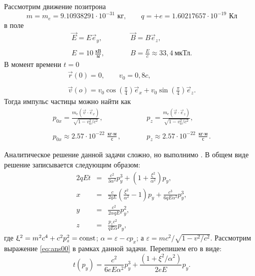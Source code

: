 Рассмотрим движение позитрона 
\begin{equation*}
m = m_e = 9.10938291 \cdot 10^{-31} \text{ кг}, \qquad q = +e = 1.60217657 \cdot 10^{-19} \text{ Кл}
\end{equation*}
в поле 
\begin{eqnarray*}
\vec{E} = E  \vec{e}_y, &\qquad& \vec{B} = B  \vec{e}_z, \\ \\
E = 10\ \frac{\text{кВ}}{\text{м}}, &\qquad& B = \frac{E}{c} \approx 33,4\ \text{мкТл}.
\end{eqnarray*}
В момент времени $t = 0$
\begin{eqnarray*}
\vec{r}(0) = 0, \qquad v_0 = 0,8c, \\ \\
 \vec{v}(o) = v_0 \cos \left( \frac{\pi}{4}\right) \vec{e}_x + v_0 \sin \left( \frac{\pi}{4}\right) \vec{e}_z.
\end{eqnarray*}
Тогда импульс частицы можно найти как
\begin{eqnarray*}
p_{0x} = \frac{m_e (\vec{v} \cdot \vec{e}_x) }{\sqrt{1 - v_0^2/c^2}}, &\qquad& p_{z} = \frac{m_e (\vec{v} \cdot \vec{e}_z) }{\sqrt{1 - v_0^2/c^2}}, \\ \\
p_{0x} \approx 2.57\cdot 10^{-22}\ \frac{\text{кг} \cdot \text{м}}{\text{с}}, &\qquad& p_{z} \approx 2.57\cdot 10^{-22}\ \frac{\text{кг} \cdot \text{м}}{\text{с}}.
\end{eqnarray*}

Аналитическое решение данной задачи сложно, но выполнимо \cite{Landau2}. В общем виде решение записывается следующим образом:
\begin{eqnarray}
2qEt &=& \frac{c^2}{3 \alpha^2} p_y^3  + \left(  1 + \frac{\xi^2}{\alpha^2}  \right) p_y, \label{eq:ans00} \\
x &=& \frac{c}{2qE} \left( \frac{\xi^2}{\alpha^2}  - 1  \right) p_y + \frac{c^3}{6qE \alpha^2} p_y^3, \label{eq:ans01} \\
y &=& \frac{c^2}{2 \alpha q E} p_y^2, \label{eq:ans02} \\
z &=& \frac{p_z c^2}{qE \alpha} p_y, \label{eq:ans03}
\end{eqnarray}
где $\upxi^2 = m^2 c^4 + c^2 p_z^2 = \operatorname{const}$; $\alpha = \varepsilon - cp_x$; а $\varepsilon = mc^2/ \sqrt{1 - v^2/c^2}$.
Рассмотрим выражение \eqref{eq:ans00} в рамках данной задачи. Перепишем его в виде:
\begin{equation}
t(p_y) =  \frac{c^2}{6eE\alpha^2} p_y^3 + \frac{(1 + \xi^2/\alpha^2)}{2 e E} p_y.
\label{eq:t_py}
\end{equation}

